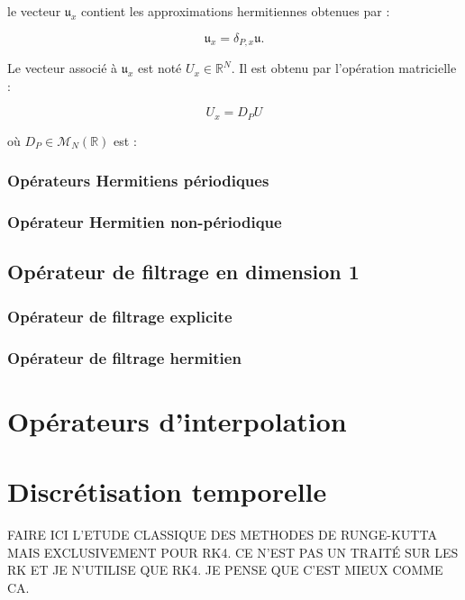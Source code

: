 le vecteur $\mathfrak{u}_x$ contient les approximations hermitiennes obtenues par :

\begin{equation}
\mathfrak{u}_x = \delta_{P,x} \mathfrak{u}.
\end{equation}

Le vecteur associé à $\mathfrak{u}_x$ est noté $U_x \in \mathbb{R}^N$. Il est obtenu par l'opération matricielle :

\begin{equation}
U_x = D_P U
\end{equation}

où $D_P \in \mathcal{M}_N(\mathbb{R})$ est :











\subsubsection{Opérateurs Hermitiens périodiques}







\subsubsection{Opérateur Hermitien non-périodique}












\subsection{Opérateur de filtrage en dimension 1}

\subsubsection{Opérateur de filtrage explicite}


\subsubsection{Opérateur de filtrage hermitien}


\section{Opérateurs d'interpolation}


\section{Discrétisation temporelle}


FAIRE ICI L'ETUDE CLASSIQUE DES METHODES DE RUNGE-KUTTA MAIS EXCLUSIVEMENT POUR RK4.
CE N'EST PAS UN TRAITÉ SUR LES RK ET JE N'UTILISE QUE RK4.
JE PENSE QUE C'EST MIEUX COMME CA.
